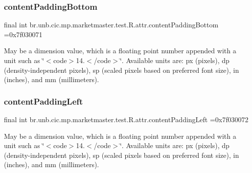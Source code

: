 \subsubsection{\texorpdfstring{content\+Padding\+Bottom}{contentPaddingBottom}}
{\footnotesize\ttfamily final int br.\+unb.\+cic.\+mp.\+marketmaster.\+test.\+R.\+attr.\+content\+Padding\+Bottom =0x7f030071\hspace{0.3cm}{\ttfamily [static]}}

May be a dimension value, which is a floating point number appended with a unit such as \char`\"{}$<$code$>$14.\+5sp$<$/code$>$\char`\"{}. Available units are\+: px (pixels), dp (density-\/independent pixels), sp (scaled pixels based on preferred font size), in (inches), and mm (millimeters). \mbox{\label{classbr_1_1unb_1_1cic_1_1mp_1_1marketmaster_1_1test_1_1R_1_1attr_a9963d4ee4e03de8a2788fd23e540002c}} 
\subsubsection{\texorpdfstring{content\+Padding\+Left}{contentPaddingLeft}}
{\footnotesize\ttfamily final int br.\+unb.\+cic.\+mp.\+marketmaster.\+test.\+R.\+attr.\+content\+Padding\+Left =0x7f030072\hspace{0.3cm}{\ttfamily [static]}}

May be a dimension value, which is a floating point number appended with a unit such as \char`\"{}$<$code$>$14.\+5sp$<$/code$>$\char`\"{}. Available units are\+: px (pixels), dp (density-\/independent pixels), sp (scaled pixels based on preferred font size), in (inches), and mm (millimeters). \mbox{\label{classbr_1_1unb_1_1cic_1_1mp_1_1marketmaster_1_1test_1_1R_1_1attr_a6f85e5b981a74596affd369d1390a64f}} 
